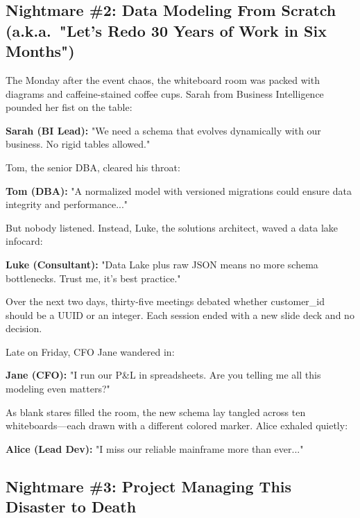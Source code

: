 \subsection{Nightmare \#2: Data Modeling From Scratch (a.k.a.\ "Let's Redo 30 Years of Work in Six Months")}

The Monday after the event chaos, the whiteboard room was packed with  
diagrams and caffeine-stained coffee cups. Sarah from Business Intelligence  
pounded her fist on the table:

\medskip

\textbf{Sarah (BI Lead):} "We need a schema that evolves dynamically with  
our business. No rigid tables allowed."

\medskip

Tom, the senior DBA, cleared his throat:

\medskip

\textbf{Tom (DBA):} "A normalized model with versioned migrations could  
ensure data integrity and performance..."

\medskip

But nobody listened. Instead, Luke, the solutions architect, waved a data lake  
infocard:

\medskip

\textbf{Luke (Consultant):} "Data Lake plus raw JSON means no more schema  
bottlenecks. Trust me, it's best practice."

\medskip

Over the next two days, thirty-five meetings debated whether customer\_id  
should be a UUID or an integer. Each session ended with a new slide deck  
and no decision.

\medskip

Late on Friday, CFO Jane wandered in:

\medskip

\textbf{Jane (CFO):} "I run our P\&L in spreadsheets. Are you telling me all  
this modeling even matters?"

\medskip

As blank stares filled the room, the new schema lay tangled across ten  
whiteboards—each drawn with a different colored marker. Alice exhaled quietly:

\medskip

\textbf{Alice (Lead Dev):} "I miss our reliable mainframe more than ever..."

\subsection{Nightmare \#3: Project Managing This Disaster to Death}

